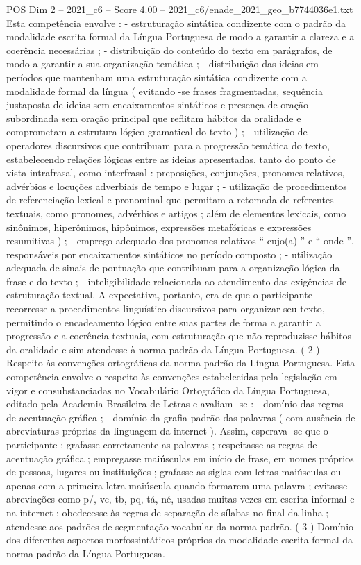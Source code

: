 \begin{textsample}{POS Dim 2 – 2021\_c6 – Score 4.00 – 2021\_c6/enade\_2021\_geo\_b7744036e1.txt}
Esta competência envolve : - estruturação sintática condizente com o padrão da modalidade escrita formal da Língua Portuguesa de modo a garantir a clareza e a coerência necessárias ; - distribuição do conteúdo do texto em parágrafos, de modo a garantir a sua organização temática ; - distribuição das ideias em períodos que mantenham uma estruturação sintática condizente com a modalidade formal da língua ( evitando -se frases fragmentadas, sequência justaposta de ideias sem encaixamentos sintáticos e presença de oração subordinada sem oração principal que reflitam hábitos da oralidade e comprometam a estrutura lógico-gramatical do texto ) ; - utilização de operadores discursivos que contribuam para a progressão temática do texto, estabelecendo relações lógicas entre as ideias apresentadas, tanto do ponto de vista intrafrasal, como interfrasal : preposições, conjunções, pronomes relativos, advérbios e locuções adverbiais de tempo e lugar ; - utilização de procedimentos de referenciação lexical e pronominal que permitam a retomada de referentes textuais, como pronomes, advérbios e artigos ; além de elementos lexicais, como sinônimos, hiperônimos, hipônimos, expressões metafóricas e expressões resumitivas ) ; - emprego adequado dos pronomes relativos “ cujo(a) ” e “ onde ”, responsáveis por encaixamentos sintáticos no período composto ; - utilização adequada de sinais de pontuação que contribuam para a organização lógica da frase e do texto ; - inteligibilidade relacionada ao atendimento das exigências de estruturação textual.
A expectativa, portanto, era de que o participante recorresse a procedimentos linguístico-discursivos para organizar seu texto, permitindo o encadeamento lógico entre suas partes de forma a garantir a progressão e a coerência textuais, com estruturação que não reproduzisse hábitos da oralidade e sim atendesse à norma-padrão da Língua Portuguesa. ( 2 ) Respeito às convenções ortográficas da norma-padrão da Língua Portuguesa.
Esta competência envolve o respeito às convenções estabelecidas pela legislação em vigor e consubstanciadas no Vocabulário Ortográfico da Língua Portuguesa, editado pela Academia Brasileira de Letras e avaliam -se : - domínio das regras de acentuação gráfica ; - domínio da grafia padrão das palavras ( com ausência de abreviaturas próprias da linguagem da internet ).
Assim, esperava -se que o participante : grafasse corretamente as palavras ; respeitasse as regras de acentuação gráfica ; empregasse maiúsculas em início de frase, em nomes próprios de pessoas, lugares ou instituições ; grafasse as siglas com letras maiúsculas ou apenas com a primeira letra maiúscula quando formarem uma palavra ; evitasse abreviações como p/, vc, tb, pq, tá, né, usadas muitas vezes em escrita informal e na internet ; obedecesse às regras de separação de sílabas no final da linha ; atendesse aos padrões de segmentação vocabular da norma-padrão. ( 3 ) Domínio dos diferentes aspectos morfossintáticos próprios da modalidade escrita formal da norma-padrão da Língua Portuguesa.

\end{textsample}

